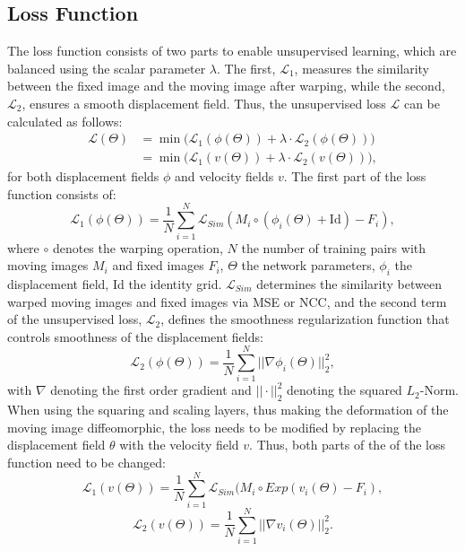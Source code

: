 \documentclass[english,version-2022-01]{uzl-thesis} %
\begin{document}
\subsection{Loss Function} \label{SubSec:LossFunction}
The loss function consists of two parts to enable unsupervised learning, which are balanced using the scalar parameter $\lambda$. The first, $\mathcal{L}_{1}$, measures the similarity between the fixed image and the moving image after warping, while the second, $\mathcal{L}_{2}$, ensures a smooth displacement field. Thus, the unsupervised loss $\mathcal{L}$ can be calculated as follows:
\begin{equation}	\label{eq:unsupervisedLoss}
	\begin{split} 
		\mathcal{L}(\Theta) &= \min  \bigg( \mathcal{L}_{1} (\phi(\Theta))  + \lambda \cdot \mathcal{L}_{2} (\phi(\Theta)) \bigg) \\
		&= \min  \bigg( \mathcal{L}_{1} (v(\Theta))  + \lambda \cdot \mathcal{L}_{2} (v(\Theta)) \bigg),
	\end{split}
\end{equation}
for both displacement fields $\phi$ and velocity fields $v$. The first part of the loss function consists of:
\begin{equation} \label{eq:L1-LossDisp}
	\mathcal{L}_{1} (\phi(\Theta)) = \frac{1}{N} \sum^{N}_{i=1} \mathcal{L}_{Sim} (M_i \circ (\phi_i(\Theta) + \text{Id}) - F_i),
\end{equation}
where $\circ$ denotes the warping operation, $N$ the number of training pairs with moving images $M_i$ and fixed images $F_i$, $\Theta$ the network parameters, $\phi_i$ the displacement field, Id the identity grid. $\mathcal{L}_{Sim}$ determines the similarity between warped moving images and fixed images via MSE or NCC, and the second term of the unsupervised loss, $\mathcal{L}_{2}$, defines the smoothness regularization function that controls smoothness of the displacement fields:
\begin{equation} \label{eq:L2-LossDisp}
	\mathcal{L}_{2} (\phi(\Theta)) = \frac{1}{N} \sum^{N}_{i=1} || \nabla \phi_i(\Theta) ||^2_2,
\end{equation}
with $\nabla$ denoting the first order gradient and $|| \cdot ||_2^2$ denoting the squared $L_2$-Norm. \\
When using the squaring and scaling layers, thus making the deformation of the moving image diffeomorphic, the loss needs to be modified by replacing the displacement field $\theta$ with the velocity field $v$. Thus, both parts of the of the loss function need to be changed:
\begin{equation}	\label{eq:L1-LossVeloc}
	\mathcal{L}_{1} (v(\Theta)) = \frac{1}{N} \sum^{N}_{i=1} \mathcal{L}_{Sim} (M_i \circ Exp(v_i(\Theta) - F_i),
\end{equation}
\begin{equation} \label{eq:L2-LossVeloc}
	\mathcal{L}_{2} (v(\Theta)) = \frac{1}{N} \sum^{N}_{i=1} || \nabla v_i(\Theta) ||^2_2  \bigg .
\end{equation}
\end{document}
